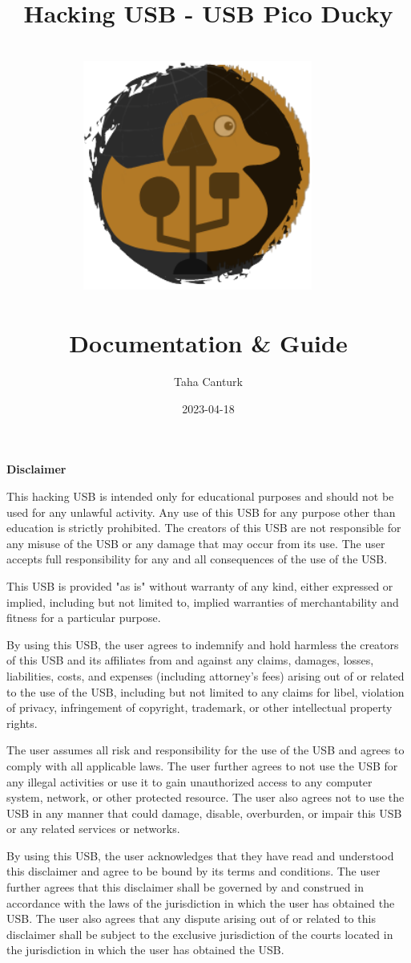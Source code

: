 \documentclass[a4paper,12pt]{article}
\title{
	\Huge Hacking USB - USB Pico Ducky\\
	\ \\
	\includegraphics[width=75.5mm]{pictures/logo.png}
	\ \\
	\ \\
	\Large Documentation \& Guide
}
\author{Taha Canturk}
\date{2023-04-18}
\begin{document}
\maketitle

\newpage

\textbf{Disclaimer}

\vspace{0.2in}

This hacking USB is intended only for educational purposes and should not be used for any unlawful activity. Any use of this USB for any purpose other than education is strictly prohibited. The creators of this USB are not responsible for any misuse of the USB or any damage that may occur from its use. The user accepts full responsibility for any and all consequences of the use of the USB.

This USB is provided "as is" without warranty of any kind, either expressed or implied, including but not limited to, implied warranties of merchantability and fitness for a particular purpose.

By using this USB, the user agrees to indemnify and hold harmless the creators of this USB and its affiliates from and against any claims, damages, losses, liabilities, costs, and expenses (including attorney's fees) arising out of or related to the use of the USB, including but not limited to any claims for libel, violation of privacy, infringement of copyright, trademark, or other intellectual property rights.

The user assumes all risk and responsibility for the use of the USB and agrees to comply with all applicable laws. The user further agrees to not use the USB for any illegal activities or use it to gain unauthorized access to any computer system, network, or other protected resource. The user also agrees not to use the USB in any manner that could damage, disable, overburden, or impair this USB or any related services or networks.

By using this USB, the user acknowledges that they have read and understood this disclaimer and agree to be bound by its terms and conditions. The user further agrees that this disclaimer shall be governed by and construed in accordance with the laws of the jurisdiction in which the user has obtained the USB. The user also agrees that any dispute arising out of or related to this disclaimer shall be subject to the exclusive jurisdiction of the courts located in the jurisdiction in which the user has obtained the USB.
\end{document}
